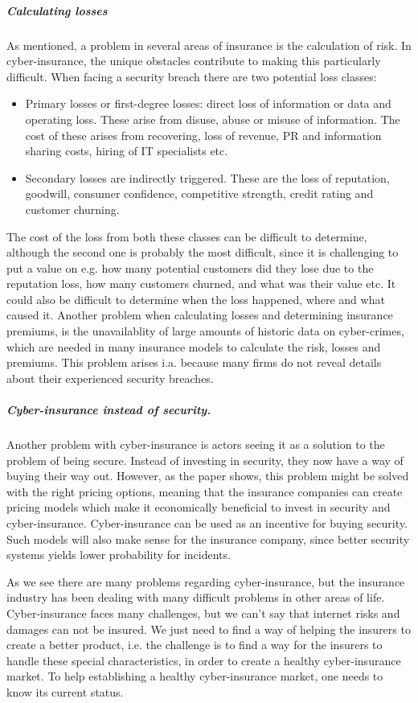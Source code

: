 \subparagraph{Calculating losses} As mentioned, a problem in several areas of insurance is the calculation of risk. In cyber-insurance, the unique obstacles contribute to making this particularly difficult. When facing a security breach there are two potential loss classes: \cite{bandyopadhyay2009managers,mehr1980principles} 
\begin{itemize}
\item Primary losses or first-degree losses: direct loss of information or data and operating loss. 
These arise from disuse, abuse or misuse of information.
 The cost of these arises from recovering, loss of revenue, 
 PR and information sharing costs, hiring of IT specialists etc.
 \item Secondary losses are indirectly triggered. These are the loss of reputation, goodwill, 
consumer confidence, competitive strength, credit rating and customer churning. 
\end{itemize}
The cost of the loss from both these classes can be difficult to determine, although the second one is probably the most difficult, since it is challenging to put a value on e.g. how many potential customers did they lose due to the reputation loss, how many customers churned, and what was their value etc.
It could also be difficult to determine when the loss happened, where and what caused it.
Another problem when calculating losses and determining insurance premiums, is the unavailablity of large amounts of historic data on cyber-crimes, which are needed in many insurance models to calculate the risk, losses and premiums. This problem arises i.a. because many firms do not reveal details about their experienced security breaches. \cite{herath2007cyber}

\subparagraph{Cyber-insurance instead of security.}
Another problem with cyber-insurance is actors seeing it as a solution to the problem of being secure. Instead of investing in security, they now have a way of buying their way out. 
However, as the paper \cite{bolot2008cyber} shows, this problem might be solved with the right pricing options, meaning that the insurance companies can create pricing models which make it economically beneficial to invest in security and cyber-insurance. Cyber-insurance can be used as an incentive for buying security. Such models will also make sense for the insurance company, since better security systems yields lower probability for incidents.

As we see there are many problems regarding cyber-insurance, but the insurance industry has been dealing with many difficult problems in other areas of life. Cyber-insurance faces many challenges, but we can't say that internet risks and damages can not be insured. We just need to find a way of helping the insurers to create a better product, i.e. the challenge is to find a way for the insurers to handle these special characteristics, in order to create a healthy cyber-insurance market. \cite{lelarge2009economic}
To help establishing a healthy cyber-insurance market, one needs to know its current status.

